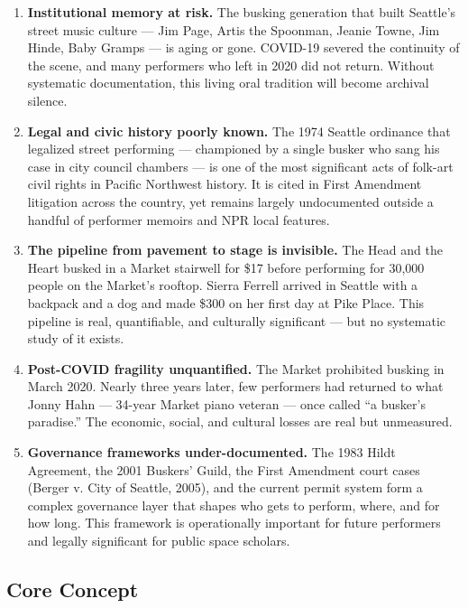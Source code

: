 \documentclass[11pt,letterpaper]{article}
\begin{document}
\begin{enumerate}[leftmargin=1.5em]
  \item \textbf{Institutional memory at risk.} The busking generation that built Seattle's street music culture --- Jim Page, Artis the Spoonman, Jeanie Towne, Jim Hinde, Baby Gramps --- is aging or gone. COVID-19 severed the continuity of the scene, and many performers who left in 2020 did not return. Without systematic documentation, this living oral tradition will become archival silence.

  \item \textbf{Legal and civic history poorly known.} The 1974 Seattle ordinance that legalized street performing --- championed by a single busker who sang his case in city council chambers --- is one of the most significant acts of folk-art civil rights in Pacific Northwest history. It is cited in First Amendment litigation across the country, yet remains largely undocumented outside a handful of performer memoirs and NPR local features.

  \item \textbf{The pipeline from pavement to stage is invisible.} The Head and the Heart busked in a Market stairwell for \$17 before performing for 30,000 people on the Market's rooftop. Sierra Ferrell arrived in Seattle with a backpack and a dog and made \$300 on her first day at Pike Place. This pipeline is real, quantifiable, and culturally significant --- but no systematic study of it exists.

  \item \textbf{Post-COVID fragility unquantified.} The Market prohibited busking in March 2020. Nearly three years later, few performers had returned to what Jonny Hahn --- 34-year Market piano veteran --- once called ``a busker's paradise.'' The economic, social, and cultural losses are real but unmeasured.

  \item \textbf{Governance frameworks under-documented.} The 1983 Hildt Agreement, the 2001 Buskers' Guild, the First Amendment court cases (Berger v. City of Seattle, 2005), and the current permit system form a complex governance layer that shapes who gets to perform, where, and for how long. This framework is operationally important for future performers and legally significant for public space scholars.
\end{enumerate}

\subsection{Core Concept}
\end{document}
